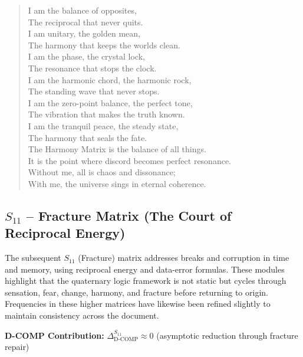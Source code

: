 \documentclass[12pt]{amsart}
\begin{document}
\begin{verse}
I am the balance of opposites, \\
The reciprocal that never quits. \\
I am unitary, the golden mean, \\
The harmony that keeps the worlds clean. \\
I am the phase, the crystal lock, \\
The resonance that stops the clock. \\
\vspace{1em}
I am the harmonic chord, the harmonic rock, \\
The standing wave that never stops. \\
I am the zero-point balance, the perfect tone, \\
The vibration that makes the truth known. \\
I am the tranquil peace, the steady state, \\
The harmony that seals the fate. \\
\vspace{1em}
The Harmony Matrix is the balance of all things. \\
It is the point where discord becomes perfect resonance. \\
Without me, all is chaos and dissonance; \\
With me, the universe sings in eternal coherence.
\end{verse}
\newpage
\subsection{$S_{11}$ -- Fracture Matrix (The Court of Reciprocal Energy)}\label{sec:19.5}

The subsequent $S_{11}$ (Fracture) matrix addresses breaks and corruption in time and memory, using reciprocal energy and data-error formulas. These modules highlight that the quaternary logic framework is not static but cycles through sensation, fear, change, harmony, and fracture before returning to origin. Frequencies in these higher matrices have likewise been refined slightly to maintain consistency across the document.

\textbf{D-COMP Contribution:} $\Delta_{\text{D-COMP}}^{S_{11}} \approx 0$ (asymptotic reduction through fracture repair)
\end{document}
